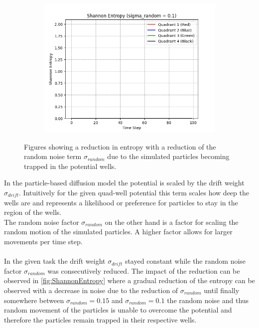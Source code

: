 \documentclass[]{scrartcl}
\begin{document}
\begin{figure}[h!]
\begin{subfigure}[c]{0.49\textwidth}
        \includegraphics[width=\linewidth]{Shannon_Entropy_(sigma_random_=_0.1).png}
    \end{subfigure}
    \caption{Figures showing a reduction in entropy with a reduction of the random noise term $\sigma_{random}$ due to the simulated particles becoming trapped in the potential wells.}
    \label{fig:ShannonEntropy}
\end{figure}

In the particle-based diffusion model the potential is scaled by the drift weight $\sigma_{drift}$. Intuitively for the given quad-well potential this term scales how deep the wells are and represents a likelihood or preference for particles to stay in the region of the wells.
\\
The random noise factor $\sigma_{random}$ on the other hand is a factor for scaling the random motion of the simulated particles. A higher factor allows for larger movements per time step.
\\ \\
In the given task the drift weight $\sigma_{drift}$ stayed constant while the random noise factor $\sigma_{random}$ was consecutively reduced. The impact of the reduction can be observed in \autoref{fig:ShannonEntropy} where a gradual reduction of the entropy can be observed with a decrease in noise due to the reduction of $\sigma_{random}$ until finally somewhere between $\sigma_{random}=0.15$ and $\sigma_{random}=0.1$ the random noise and thus random movement of the particles is unable to overcome the potential and therefore the particles remain trapped in their respective wells.
\end{document}
